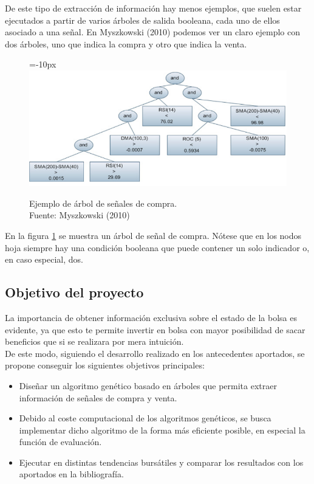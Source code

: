      De este tipo de extracci\'on de informaci\'on hay menos ejemplos, que suelen estar ejecutados a partir de varios \'arboles de salida booleana, cada uno de ellos asociado a una se\~nal. En Myszkowski (2010) podemos ver un claro ejemplo con dos \'arboles, uno que indica la compra y otro que indica la venta.
     
     	\begin{figure}[H]
			\centering\leftskip=-10px
			\includegraphics[scale=0.8]{imagenes/tree_halfinfo.png}
			\caption[Ejemplo de \'arbol de señales de compra]{Ejemplo de \'arbol de señales de compra. \\Fuente: Myszkowski (2010)}
			\label{fig:tree_half_info}
		\end{figure}
		
	En la figura \ref{fig:tree_half_info} se muestra un \'arbol de se\~nal de compra. N\'otese que en los nodos hoja siempre hay una condici\'on booleana que puede contener un solo indicador o, en caso especial, dos.
	
	\subsection{Objetivo del proyecto}
	La importancia de obtener informaci\'on exclusiva sobre el estado de la bolsa es evidente, ya que esto te permite invertir en bolsa con mayor posibilidad de sacar beneficios que si se realizara por mera intuici\'on.\\
	
	De este modo, siguiendo el desarrollo realizado en los antecedentes aportados, se propone conseguir los siguientes objetivos principales:
	
	\begin{itemize}
	    \item Dise\~nar un algoritmo gen\'etico basado en \'arboles que permita extraer informaci\'on de se\~nales de compra y venta.
	    \item Debido al coste computacional de los algoritmos gen\'eticos, se busca implementar dicho algoritmo de la forma m\'as eficiente posible, en especial la funci\'on de evaluaci\'on.
	    \item Ejecutar en distintas tendencias burs\'atiles y comparar los resultados con los aportados en la bibliograf\'ia.
	\end{itemize}
	

